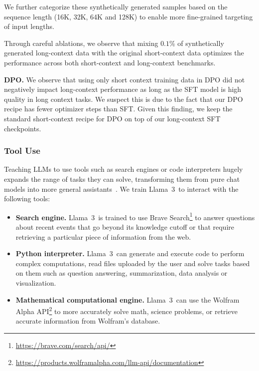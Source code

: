 We further categorize these synthetically generated samples based on the sequence length (16K, 32K, 64K and 128K) to enable more fine-grained targeting of input lengths.

Through careful ablations, we observe that mixing $0.1$\% of synthetically generated long-context data with the original short-context data optimizes the performance across both short-context and long-context benchmarks. 

\textbf{DPO.} 
We observe that using only short context training data in DPO did not negatively impact long-context performance as long as the SFT model is high quality in long context tasks. We suspect this is due to the fact that our DPO recipe has fewer optimizer steps than SFT.  Given this finding, we keep the standard short-context recipe for DPO on top of our long-context SFT checkpoints.

\subsubsection{Tool Use}
\label{subsubsec:tool_use}

Teaching LLMs to use tools such as search engines or code interpreters hugely expands the range of tasks they can solve, transforming them from pure chat models into more general assistants~\citep{nakano2021webgpt,thoppilan2022lamdalanguagemodelsdialog,parisi2022talm,gao2023pal,mialon2023augmented,schick2024toolformer}. We train Llama~3~to interact with the following tools:

\begin{itemize}
    \item \textbf{Search engine.} Llama~3~is trained to use Brave Search\footnote{\url{https://brave.com/search/api/}} to answer questions about recent events that go beyond its knowledge cutoff or that require retrieving a particular piece of information from the web.
    \item \textbf{Python interpreter.} Llama~3~can generate and execute code to perform complex computations, read files uploaded by the user and solve tasks based on them such as question answering, summarization, data analysis or visualization. 
    \item \textbf{Mathematical computational engine.} Llama~3~can use the Wolfram Alpha API\footnote{\url{https://products.wolframalpha.com/llm-api/documentation}} to more accurately solve math, science problems, or retrieve accurate information from Wolfram's database. 
\end{itemize}

